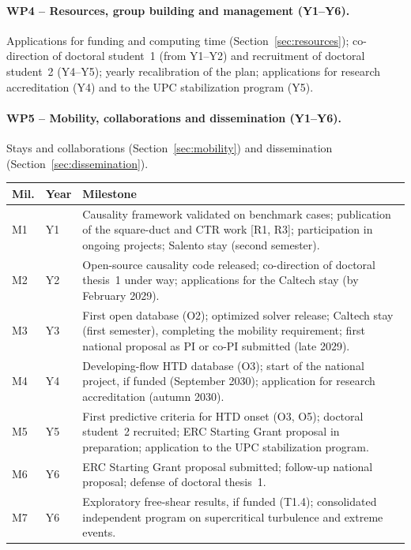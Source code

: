 \documentclass[11pt]{article}
\begin{document}
\paragraph{WP4 -- Resources, group building and management (Y1--Y6).} Applications for
funding and computing time (Section~\ref{sec:resources}); co-direction of doctoral student~1
(from Y1--Y2) and recruitment of doctoral student~2 (Y4--Y5); yearly recalibration of the plan;
applications for research accreditation (Y4) and to the UPC stabilization program (Y5).

\paragraph{WP5 -- Mobility, collaborations and dissemination (Y1--Y6).} Stays and
collaborations (Section~\ref{sec:mobility}) and dissemination
(Section~\ref{sec:dissemination}).

\begin{center}\small
\begin{tabularx}{\textwidth}{@{}p{0.8cm}p{1.35cm}X@{}}
\toprule
\textbf{Mil.} & \textbf{Year} & \textbf{Milestone} \\
\midrule
M1 & Y1 & Causality framework validated on benchmark cases; publication of the square-duct and CTR work [R1, R3]; participation in ongoing projects; Salento stay (second semester). \\
M2 & Y2 & Open-source causality code released; co-direction of doctoral thesis~1 under way; applications for the Caltech stay (by February 2029). \\
M3 & Y3 & First open database (O2); optimized solver release; Caltech stay (first semester), completing the mobility requirement; first national proposal as PI or co-PI submitted (late 2029). \\
M4 & Y4 & Developing-flow HTD database (O3); start of the national project, if funded (September 2030); application for research accreditation (autumn 2030). \\
M5 & Y5 & First predictive criteria for HTD onset (O3, O5); doctoral student~2 recruited; ERC Starting Grant proposal in preparation; application to the UPC stabilization program. \\
M6 & Y6 & ERC Starting Grant proposal submitted; follow-up national proposal; defense of doctoral thesis~1. \\
M7 & Y6 & Exploratory free-shear results, if funded (T1.4); consolidated independent program on supercritical turbulence and extreme events. \\
\bottomrule
\end{tabularx}
\end{center}
\end{document}
